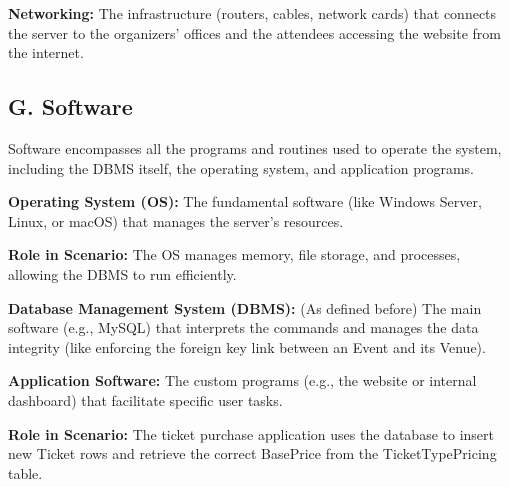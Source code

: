 \documentclass[12pt]{article}
\begin{document}
\textbf{Networking:} The infrastructure (routers, cables, network cards) that connects the server to the organizers' offices and the attendees accessing the website from the internet.

\subsection*{G. Software}
Software encompasses all the programs and routines used to operate the system, including the DBMS itself, the operating system, and application programs.

\textbf{Operating System (OS):} The fundamental software (like Windows Server, Linux, or macOS) that manages the server's resources.

\textbf{Role in Scenario:} The OS manages memory, file storage, and processes, allowing the DBMS to run efficiently.

\textbf{Database Management System (DBMS):} (As defined before) The main software (e.g., MySQL) that interprets the commands and manages the data integrity (like enforcing the foreign key link between an Event and its Venue).

\textbf{Application Software:} The custom programs (e.g., the website or internal dashboard) that facilitate specific user tasks.

\textbf{Role in Scenario:} The ticket purchase application uses the database to insert new Ticket rows and retrieve the correct BasePrice from the TicketTypePricing table.
\end{document}
